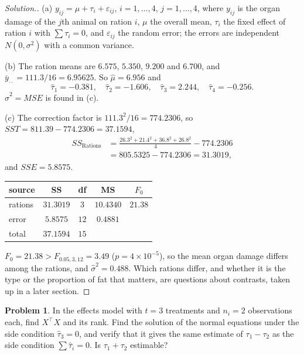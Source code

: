 \documentclass[11pt,a4paper]{article}
\numberwithin{equation}{section}
\theoremstyle{definition}
\newtheorem{problemx}{Problem}[subsection]
\newenvironment{problem}{\begin{problemx}}{\end{problemx}}
\newenvironment{solution}
  {\renewcommand{\qedsymbol}{}\begin{proof}[\textit{Solution}.]}
  {\end{proof}}
\begin{document}
\begin{solution}
(a) $y_{ij} = \mu + \tau_i + \varepsilon_{ij}$, $i = 1, \dots, 4$, $j = 1, \dots, 4$, where $y_{ij}$ is the organ damage of the $j$th animal on ration $i$, $\mu$ the overall mean, $\tau_i$ the
fixed effect of ration $i$ with $\sum\tau_i = 0$, and $\varepsilon_{ij}$ the random error; the errors are independent $N(0, \sigma^2)$ with a common variance.

(b) The ration means are $6.575$, $5.350$, $9.200$ and $6.700$, and $\bar y_{\cdot\cdot} = 111.3/16 = 6.95625$. So $\hat\mu = 6.956$ and
\[
\hat\tau_1 = -0.381 , \quad \hat\tau_2 = -1.606 , \quad \hat\tau_3 = 2.244 , \quad \hat\tau_4 = -0.256 .
\]
$\hat\sigma^2 = MSE$ is found in (c).

(c) The correction factor is $111.3^2/16 = 774.2306$, so $SST = 811.39 - 774.2306 = 37.1594$,
\begin{align*}
SS_{\mathrm{Rations}} &= \frac{26.3^2 + 21.4^2 + 36.8^2 + 26.8^2}{4} - 774.2306 \\
&= 805.5325 - 774.2306 = 31.3019 ,
\end{align*}
and $SSE = 5.8575$.
\begin{center}
\begin{tabular}{l|c|c|c|c}
source & SS & df & MS & $F_0$ \\
\hline
rations & $31.3019$ & $3$ & $10.4340$ & $21.38$ \\
error & $5.8575$ & $12$ & $0.4881$ & \\
\hline
total & $37.1594$ & $15$ & &
\end{tabular}
\end{center}
$F_0 = 21.38 > F_{0.05,3,12} = 3.49$ ($p = 4 \times 10^{-5}$), so the mean organ damage differs among the rations, and $\hat\sigma^2 = 0.488$. Which rations differ, and
whether it is the type or the proportion of fat that matters, are questions about contrasts, taken up in a later section.
\end{solution}

\begin{problem}
In the effects model with $t = 3$ treatments and $n_i = 2$ observations each, find $X^\top X$ and its rank. Find the solution of the normal equations
under the side condition $\hat\tau_3 = 0$, and verify that it gives the same estimate of $\tau_1 - \tau_2$ as the side condition $\sum\hat\tau_i = 0$. Is $\tau_1 + \tau_2$
estimable?
\end{problem}
\end{document}
